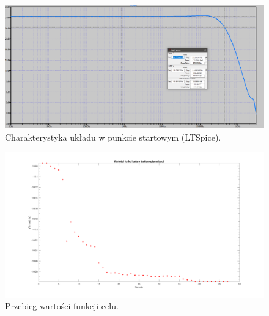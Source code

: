 \documentclass{article}
\begin{document}
\clearpage
\pagebreak
\begin{landscape}
    \begin{figure}[h]
        \vspace*{-2cm}
        \includegraphics[width=20cm,height=10 cm]{graphics/starting_point_spice.png}
        \centering
        \caption{Charakterystyka układu w punkcie startowym (LTSpice).}
    \end{figure}
\end{landscape}

\pagebreak
\begin{landscape}
    \begin{figure}[h]
        \vspace*{-2cm}
        \includegraphics[width=25cm,height=15 cm]{graphics/fval.png}
        \centering
        \caption{Przebieg wartości funkcji celu.}
    \end{figure}
\end{landscape}
\end{document}
